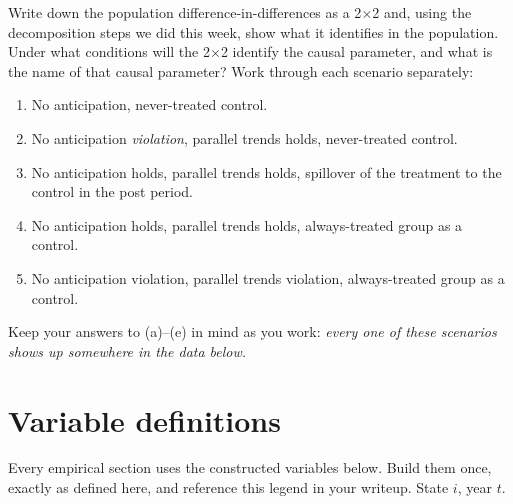 \documentclass[11pt,a4paper]{article}
\begin{document}
Write down the population difference-in-differences as a 2$\times$2 and, using the decomposition steps we did this week, show what it identifies in the population. Under what conditions will the 2$\times$2 identify the causal parameter, and what is the name of that causal parameter? Work through each scenario separately:

\begin{enumerate}[label=(\alph*), itemsep=2pt]
  \item No anticipation, never-treated control.
  \item No anticipation \emph{violation}, parallel trends holds, never-treated control.
  \item No anticipation holds, parallel trends holds, spillover of the treatment to the control in the post period.
  \item No anticipation holds, parallel trends holds, always-treated group as a control.
  \item No anticipation violation, parallel trends violation, always-treated group as a control.
\end{enumerate}

\noindent Keep your answers to (a)--(e) in mind as you work: \emph{every one of these scenarios shows up somewhere in the data below.}

\section*{Variable definitions}

Every empirical section uses the constructed variables below. Build them once, exactly as defined here, and reference this legend in your writeup. State $i$, year $t$.
\end{document}
